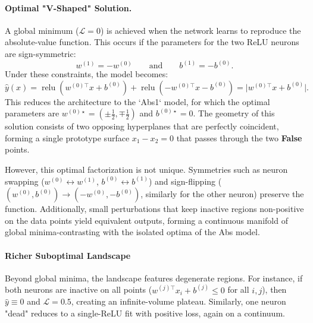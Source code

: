 \paragraph{Optimal "V-Shaped" Solution.}
A global minimum (\(\mathcal{L}=0\)) is achieved when the network learns to reproduce the absolute-value function. This occurs if the parameters for the two ReLU neurons are sign-symmetric:
\[
    w^{(1)} = -w^{(0)} \qquad \text{and} \qquad b^{(1)} = -b^{(0)}.
\]
Under these constraints, the model becomes:
\[
    \hat y(x) = \operatorname{relu}(w^{(0)\!\top}x + b^{(0)}) + \operatorname{relu}(-w^{(0)\!\top}x - b^{(0)}) = \lvert w^{(0)\!\top}x + b^{(0)} \rvert.
\]
This reduces the architecture to the `Abs1` model, for which the optimal parameters are \(w^{(0)\star} = (\pm\tfrac12, \mp\tfrac12)\) and \(b^{(0)\star}=0\). The geometry of this solution consists of two opposing hyperplanes that are perfectly coincident, forming a single prototype surface \(x_1 - x_2 = 0\) that passes through the two \textbf{False} points.

However, this optimal factorization is not unique. Symmetries such as neuron swapping (\(w^{(0)} \leftrightarrow w^{(1)}\), \(b^{(0)} \leftrightarrow b^{(1)}\)) and sign-flipping (\((w^{(0)}, b^{(0)}) \to (-w^{(0)}, -b^{(0)})\), similarly for the other neuron) preserve the function. Additionally, small perturbations that keep inactive regions non-positive on the data points yield equivalent outputs, forming a continuous manifold of global minima-contrasting with the isolated optima of the Abs model.

\paragraph{Richer Suboptimal Landscape}
Beyond global minima, the landscape features degenerate regions. For instance, if both neurons are inactive on all points (\(w^{(j)\!\top}x_i + b^{(j)} \leq 0\) for all \(i,j\)), then \(\hat{y} \equiv 0\) and \(\mathcal{L} = 0.5\), creating an infinite-volume plateau. Similarly, one neuron "dead" reduces to a single-ReLU fit with positive loss, again on a continuum.

